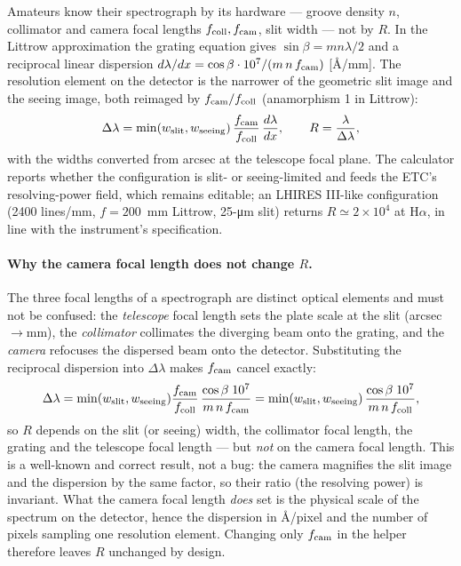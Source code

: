Amateurs know their spectrograph by its hardware — groove density $n$,
collimator and camera focal lengths $f_{\rm coll}, f_{\rm cam}$, slit
width — not by $R$. In the Littrow approximation the grating equation
gives $\sin\beta = m n \lambda/2$ and a reciprocal linear dispersion
$d\lambda/dx = \cos\beta \cdot 10^{7}/(m\,n\,f_{\rm cam})$
[\si{\angstrom}/mm]. The resolution element on the detector is the
narrower of the geometric slit image and the seeing image, both reimaged
by $f_{\rm cam}/f_{\rm coll}$ (anamorphism 1 in Littrow):
\begin{equation}
  \Delta\lambda = \min(w_{\rm slit}, w_{\rm seeing})\,
  \frac{f_{\rm cam}}{f_{\rm coll}}\,\frac{d\lambda}{dx},
  \qquad R = \frac{\lambda}{\Delta\lambda},
\end{equation}
with the widths converted from arcsec at the telescope focal plane. The
calculator reports whether the configuration is slit- or seeing-limited
and feeds the ETC's resolving-power field, which remains editable; an
LHIRES III-like configuration (2400 lines/mm, $f=200$~mm Littrow, 25-\si{\micro\metre}
slit) returns $R \simeq 2\times10^4$ at H$\alpha$, in line with the
instrument's specification.

\paragraph{Why the camera focal length does not change $R$.} The three
focal lengths of a spectrograph are distinct optical elements and must not
be confused: the \emph{telescope} focal length sets the plate scale at the
slit (arcsec$\to$mm), the \emph{collimator} collimates the diverging beam
onto the grating, and the \emph{camera} refocuses the dispersed beam onto
the detector. Substituting the reciprocal dispersion into $\Delta\lambda$
makes $f_{\rm cam}$ cancel exactly:
\begin{equation}
  \Delta\lambda = \min(w_{\rm slit}, w_{\rm seeing})
  \frac{f_{\rm cam}}{f_{\rm coll}}\,
  \frac{\cos\beta\;10^{7}}{m\,n\,f_{\rm cam}}
  = \min(w_{\rm slit}, w_{\rm seeing})\,
  \frac{\cos\beta\;10^{7}}{m\,n\,f_{\rm coll}} ,
\end{equation}
so $R$ depends on the slit (or seeing) width, the collimator focal length,
the grating and the telescope focal length — but \emph{not} on the camera
focal length. This is a well-known and correct result, not a bug: the
camera magnifies the slit image and the dispersion by the same factor, so
their ratio (the resolving power) is invariant. What the camera focal
length \emph{does} set is the physical scale of the spectrum on the
detector, hence the dispersion in \si{\angstrom}/pixel and the number of
pixels sampling one resolution element. Changing only $f_{\rm cam}$ in the
helper therefore leaves $R$ unchanged by design.

